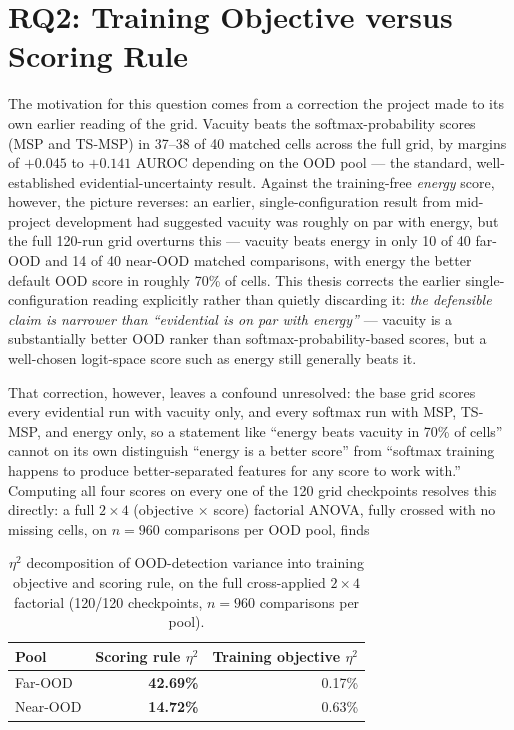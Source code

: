 \documentclass{iutbscthesis}
\begin{document}
\section{RQ2: Training Objective versus Scoring Rule}
\label{sec:results-rq2}

The motivation for this question comes from a correction the project made to its own earlier reading of the grid. Vacuity beats the softmax-probability scores (MSP and TS-MSP) in 37--38 of 40 matched cells across the full grid, by margins of $+0.045$ to $+0.141$ AUROC depending on the OOD pool — the standard, well-established evidential-uncertainty result. Against the training-free \emph{energy} score, however, the picture reverses: an earlier, single-configuration result from mid-project development had suggested vacuity was roughly on par with energy, but the full 120-run grid overturns this — vacuity beats energy in only 10 of 40 far-OOD and 14 of 40 near-OOD matched comparisons, with energy the better default OOD score in roughly 70\% of cells. This thesis corrects the earlier single-configuration reading explicitly rather than quietly discarding it: \emph{the defensible claim is narrower than ``evidential is on par with energy''} — vacuity is a substantially better OOD ranker than softmax-probability-based scores, but a well-chosen logit-space score such as energy still generally beats it.

That correction, however, leaves a confound unresolved: the base grid scores every evidential run with vacuity only, and every softmax run with MSP, TS-MSP, and energy only, so a statement like ``energy beats vacuity in 70\% of cells'' cannot on its own distinguish ``energy is a better score'' from ``softmax training happens to produce better-separated features for any score to work with.'' Computing all four scores on every one of the 120 grid checkpoints resolves this directly: a full $2 \times 4$ (objective $\times$ score) factorial ANOVA, fully crossed with no missing cells, on $n = 960$ comparisons per OOD pool, finds

\begin{table}[H]
    \centering
    \small
    \begin{tabular}{lrr}
        \toprule
        Pool & Scoring rule $\eta^2$ & Training objective $\eta^2$ \\
        \midrule
        Far-OOD & \textbf{42.69\%} & 0.17\% \\
        Near-OOD & \textbf{14.72\%} & 0.63\% \\
        \bottomrule
    \end{tabular}
    \caption{$\eta^2$ decomposition of OOD-detection variance into training objective and scoring rule, on the full cross-applied $2 \times 4$ factorial (120/120 checkpoints, $n=960$ comparisons per pool).}
    \label{tab:rq2-eta2}
\end{table}
\end{document}

